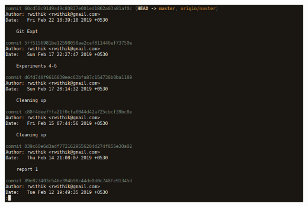 \documentclass[10pt,a4paper,titlepage]{report}
\begin{document}
\includegraphics[scale=0.45]{../Images/VCS/6.png}
\end{document}
